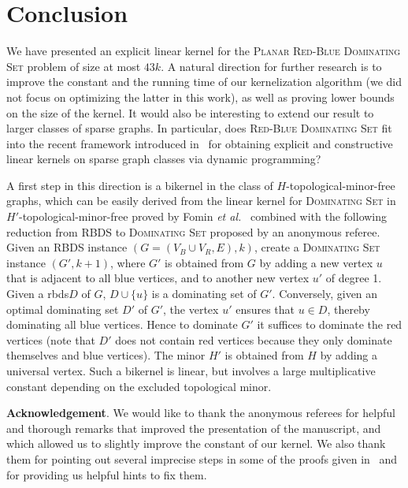 \documentclass[a4paper,11pt]{article}
\newcommand{\dom}    [0] {\textsc{Dominating Set}\xspace}
\newcommand{\rbds}{rbds\xspace}
\newcommand{\RBDS}{\textsc{RBDS}\xspace}
\begin{document}
\section{Conclusion}
\label{sec:concl}

We have presented an explicit linear kernel for the \textsc{Planar Red-Blue Dominating Set} problem of size at most $43k$. A natural direction for further research is to improve the constant and the running time of our kernelization algorithm (we did not focus on optimizing the latter in this work), as well as proving lower bounds on the size of the kernel. It would also be interesting to extend our result to larger classes of sparse graphs. In particular, does \textsc{Red-Blue Dominating Set} fit into the recent framework introduced in~\cite{GPST13} for obtaining explicit and constructive linear kernels on sparse graph classes via dynamic programming?

A first step in this direction is a bikernel in the class of $H$-topological-minor-free graphs, which can be easily derived from the linear kernel for \dom in $H'$-topological-minor-free proved by Fomin \emph{et al.}~\cite{FLST13} combined with the following reduction from \RBDS to \dom proposed by an anonymous referee. Given an \RBDS instance $(G = (V_B \cup V_R,E), k)$, create a \dom instance $(G',k+1)$, where $G'$ is obtained from $G$ by adding a new vertex $u$ that is adjacent to all blue vertices, and to another new vertex $u'$ of degree 1. Given a \rbds $D$ of $G$, $D \cup\{u\}$ is a dominating set of $G'$. Conversely, given an optimal dominating set $D'$ of $G'$, the vertex $u'$ ensures that $u \in D$, thereby dominating all blue vertices. Hence to dominate $G'$ it suffices to dominate the red vertices (note that $D'$ does not contain red vertices because they only dominate themselves and blue vertices). The minor $H'$ is obtained from $H$ by adding a universal vertex. Such a bikernel is linear, but involves a large multiplicative constant depending on the excluded topological minor.


\vspace{.5cm}
\noindent \textbf{Acknowledgement}. We would like to thank the anonymous referees for helpful and thorough remarks that improved the presentation of the manuscript, and which allowed us to slightly improve the constant of our kernel. We also thank them for pointing out several imprecise steps in some of the proofs given in~\cite{AFN04} and for providing us helpful hints to fix them.
\end{document}
